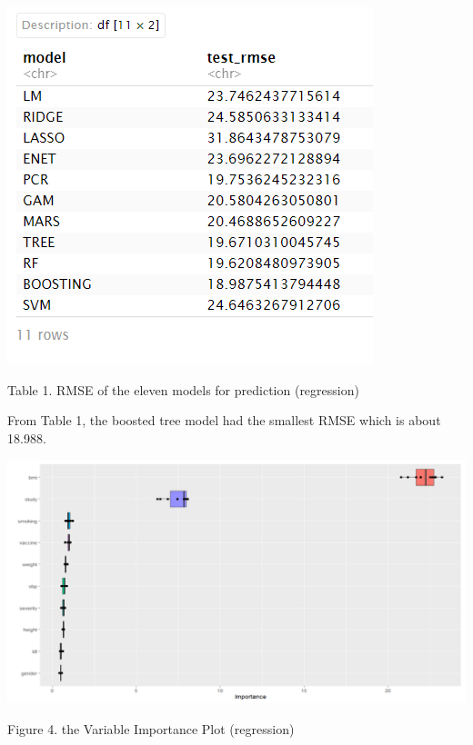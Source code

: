 \documentclass[
]{article}
\begin{document}
\begin{center}\includegraphics[width=0.9\linewidth,height=0.7\textheight]{primary_analysis_plot/test_rmse} \end{center}
\begin{center}
Table 1. RMSE of the eleven models for prediction (regression)
\end{center}

From Table 1, the boosted tree model had the smallest RMSE which is
about 18.988.

\begin{center}\includegraphics[width=0.9\linewidth,height=0.7\textheight]{primary_analysis_plot/variable_selection} \end{center}
\begin{center}
Figure 4. the Variable Importance Plot (regression)
\end{center}
\end{document}
